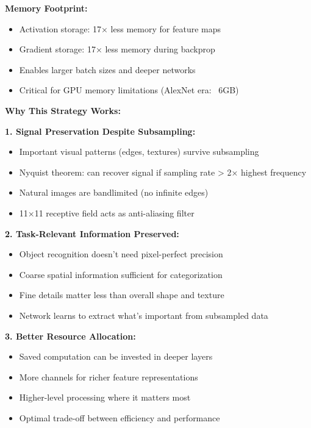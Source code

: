\documentclass[12pt]{article}
\newcommand{\explanation}[1]{{\color{explanationcolor}#1}}
\begin{document}
\begin{enumerate}[(a)]
{{    \textbf{Memory Footprint:}
    \begin{itemize}
        \item Activation storage: 17× less memory for feature maps
        \item Gradient storage: 17× less memory during backprop
        \item Enables larger batch sizes and deeper networks
        \item Critical for GPU memory limitations (AlexNet era: ~6GB)
    \end{itemize}
    }
    
    \textbf{Why This Strategy Works:}
    
    \explanation{
    \textbf{1. Signal Preservation Despite Subsampling:}
    \begin{itemize}
        \item Important visual patterns (edges, textures) survive subsampling
        \item Nyquist theorem: can recover signal if sampling rate > 2× highest frequency
        \item Natural images are bandlimited (no infinite edges)
        \item 11×11 receptive field acts as anti-aliasing filter
    \end{itemize}
    
    \textbf{2. Task-Relevant Information Preserved:}
    \begin{itemize}
        \item Object recognition doesn't need pixel-perfect precision
        \item Coarse spatial information sufficient for categorization
        \item Fine details matter less than overall shape and texture
        \item Network learns to extract what's important from subsampled data
    \end{itemize}
    
    \textbf{3. Better Resource Allocation:}
    \begin{itemize}
        \item Saved computation can be invested in deeper layers
        \item More channels for richer feature representations
        \item Higher-level processing where it matters most
        \item Optimal trade-off between efficiency and performance
    \end{itemize}
    }
    
}
\end{enumerate}
\end{document}
